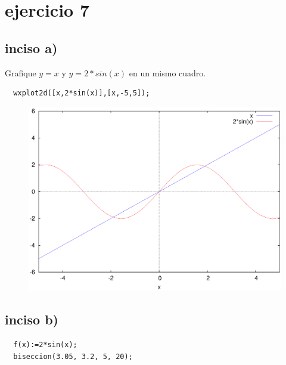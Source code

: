 \section{ejercicio 7}

\subsection{inciso a)}
Grafique $y=x$ y $y=2*sin(x)$ en un mismo cuadro.

\begin{verbatim}
  wxplot2d([x,2*sin(x)],[x,-5,5]);
\end{verbatim}

\begin{figure}[H]
  \centering
  \includegraphics[scale=0.45]{img/maxout_1.eps}
\end{figure}

\subsection{inciso b)}
\begin{verbatim}
  f(x):=2*sin(x);
  biseccion(3.05, 3.2, 5, 20);
\end{verbatim}

